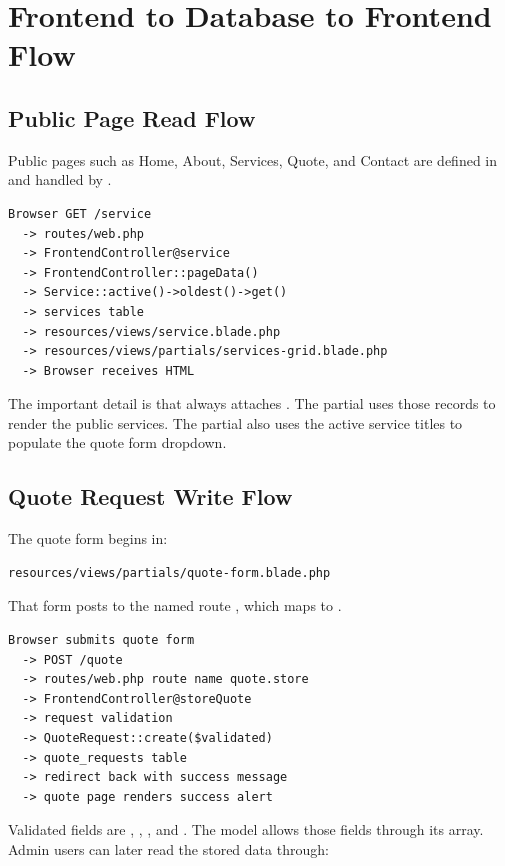 \documentclass[11pt,a4paper]{article}
\begin{document}
\section{Frontend to Database to Frontend Flow}

\subsection{Public Page Read Flow}

Public pages such as Home, About, Services, Quote, and Contact are defined in  and handled by .

\begin{verbatim}
Browser GET /service
  -> routes/web.php
  -> FrontendController@service
  -> FrontendController::pageData()
  -> Service::active()->oldest()->get()
  -> services table
  -> resources/views/service.blade.php
  -> resources/views/partials/services-grid.blade.php
  -> Browser receives HTML
\end{verbatim}

The important detail is that  always attaches . The  partial uses those records to render the public services. The  partial also uses the active service titles to populate the quote form dropdown.

\subsection{Quote Request Write Flow}

The quote form begins in:

\begin{verbatim}
resources/views/partials/quote-form.blade.php
\end{verbatim}

That form posts to the named route , which maps to .

\begin{verbatim}
Browser submits quote form
  -> POST /quote
  -> routes/web.php route name quote.store
  -> FrontendController@storeQuote
  -> request validation
  -> QuoteRequest::create($validated)
  -> quote_requests table
  -> redirect back with success message
  -> quote page renders success alert
\end{verbatim}

Validated fields are , , , and . The  model allows those fields through its  array. Admin users can later read the stored data through:
\end{document}
